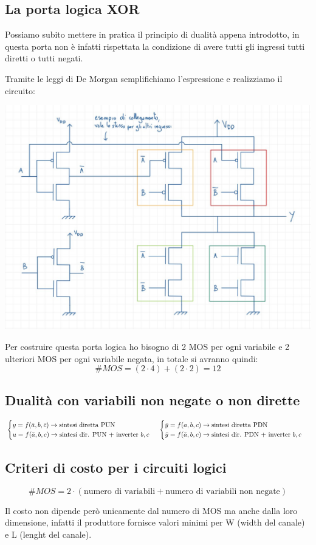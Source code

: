 \documentclass[11pt,a4paper,]{article}
\newcommand{\s}{\hspace{1mm}}
\begin{document}
\subsection{La porta logica XOR}
\begin{nota}
	Possiamo subito mettere in pratica il principio di dualità appena introdotto, in questa porta non è infatti rispettata la condizione di avere tutti gli ingressi tutti diretti o tutti negati.
\end{nota}
Tramite le leggi di De Morgan semplifichiamo l'espressione e realizziamo il circuito:
\begin{center}
	\includegraphics[width=0.4\linewidth]{"img/circ xor"}
\end{center}
Per costruire questa porta logica ho bisogno di 2 MOS per ogni variabile e 2 ulteriori MOS per ogni variabile negata, in totale si avranno quindi:
\[
\#MOS = (2\cdot 4) + (2\cdot 2) = 12
\]
\subsection{Dualità con variabili non negate o non dirette}
\[
\begin{cases}
	y = f(\bar{a}, b, \bar{c}) \to \text{sintesi diretta PUN} \\
	u = f(\bar{a}, b, c) \to \text{sintesi dir. PUN + inverter } b, c
\end{cases}
\s
\begin{cases}
	\bar{y} = f(a, b, c) \to \text{sintesi diretta PDN} \\
	\bar{y} = f(\bar{a}, b, c) \to \text{sintesi dir. PDN + inverter } b, c
\end{cases}
\]
\subsection{Criteri di costo per i circuiti logici}
\begin{definizione}
	\[
	\# MOS = 2\cdot (\text{numero di variabili}+\text{numero di variabili non negate})
	\]
\end{definizione}
Il costo non dipende però unicamente dal numero di MOS ma anche dalla loro dimensione, infatti il produttore fornisce valori minimi per W (width del canale) e L (lenght del canale).
\end{document}
